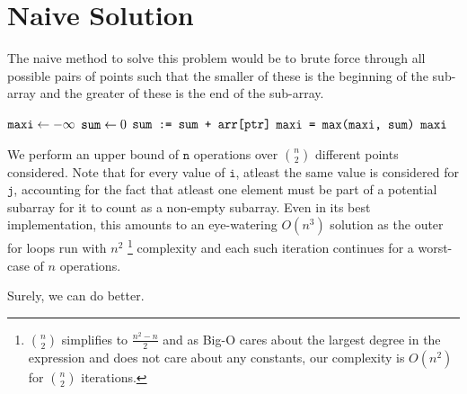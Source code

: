
\section{Naive Solution}
The naive method to solve this problem would be to brute force through all possible pairs of points such that the smaller of these is the beginning of the sub-array and the greater of these is the end of the sub-array.

\begin{algorithm}
\caption{}\label{naive}
\begin{algorithmic}[1]
\State $\texttt{maxi} \gets -\infty$
        \State $\texttt{sum} \gets 0$
            \State $\texttt{sum := sum + arr[ptr]}$
        \EndFor
        \State $\texttt{maxi = max(maxi, sum)}$
    \EndFor
\EndFor 
\State \Return $\texttt{maxi}$
\end{algorithmic}
\end{algorithm}

\noindent We perform an upper bound of $\texttt{n}$ operations over $\binom{n}{2}$ different points considered. Note that for every value of $\texttt{i}$, atleast the same value is considered for $\texttt{j}$, accounting for the fact that atleast one element must be part of a potential subarray for it to count as a non-empty subarray. Even in its best implementation, this amounts to an eye-watering $O(n^3)$ solution as the outer for loops run with $n^2$ \footnote{$\binom{n}{2}$ simplifies to $\frac{n^2-n}{2}$ and as Big-O cares about the largest degree in the expression and does not care about any constants, our complexity is $O(n^2)$ for $\binom{n}{2}$ iterations.} complexity and each such iteration continues for a worst-case of $n$ operations.  \newline

\noindent Surely, we can do better.
